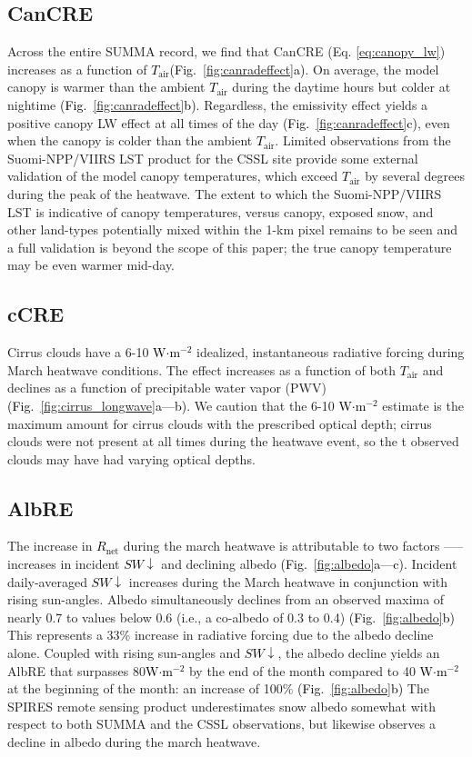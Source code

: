 \documentclass[12pt]{iopjournal}
\newcommand{\fig}[2]{\textcolor{black}{(Fig.~\ref{#1}{#2})}}   %
\newcommand{\tair}{\textcolor{black}{$T_{\mathrm{air}}$}\xspace}
\newcommand{\rnet}{\textcolor{black}{$R_{\mathrm{net}}$}\xspace}
\newcommand{\swdn}{\textcolor{black}{$SW\downarrow$}\xspace}
\newcommand{\wmsq}{\textcolor{black}{W$\cdot$m$^{-2}$}\xspace}
\begin{document}


\subsection{CanCRE}
Across the entire SUMMA record, we find that CanCRE (Eq. \ref{eq:canopy_lw}) increases as a function of \tair \fig{fig:canradeffect}{a}.
On average, the model canopy is warmer than the ambient \tair during the daytime hours but colder at nightime \fig{fig:canradeffect}{b}.
Regardless, the emissivity effect yields a positive canopy LW effect at all times of the day \fig{fig:canradeffect}{c}, even when the canopy is colder than the ambient \tair.
Limited observations from the Suomi-NPP/VIIRS LST product for the CSSL site provide some external validation of the model canopy temperatures, which exceed \tair by several degrees during the peak of the heatwave. 
The extent to which the Suomi-NPP/VIIRS LST is indicative of canopy temperatures, versus canopy, exposed snow, and other land-types potentially mixed within the 1-km pixel remains to be seen and a full validation is beyond the scope of this paper; the true canopy temperature may be even warmer mid-day.


\subsection{cCRE}
Cirrus clouds have a 6-10 \wmsq idealized, instantaneous radiative forcing during March heatwave conditions. 
The effect increases as a function of both \tair and declines as a function of precipitable water vapor (PWV) \fig{fig:cirrus_longwave}{a---b}.
We caution that the 6-10 \wmsq estimate is the maximum amount for cirrus clouds with the prescribed optical depth; cirrus clouds were not present at all times during the heatwave event, so the t observed clouds may have had varying optical depths. 


\subsection{AlbRE}
The increase in \rnet during the march heatwave is attributable to two factors —-- increases in incident \swdn and declining albedo \fig{fig:albedo}{a---c}.
Incident daily-averaged \swdn increases during the March heatwave in conjunction with rising sun-angles. 
Albedo simultaneously declines from an observed maxima of nearly 0.7 to values below 0.6 (i.e., a co-albedo of 0.3 to 0.4) \fig{fig:albedo}{b}
This represents a 33\% increase in radiative forcing due to the albedo decline alone.
Coupled with rising sun-angles and \swdn, the albedo decline yields an AlbRE that surpasses 80\wmsq by the end of the month compared to 40 \wmsq at the beginning of the month: an increase of 100\% \fig{fig:albedo}{b}
The SPIRES remote sensing product underestimates snow albedo somewhat with respect to both SUMMA and the CSSL observations, but likewise observes a decline in albedo during the march heatwave.
\end{document}
